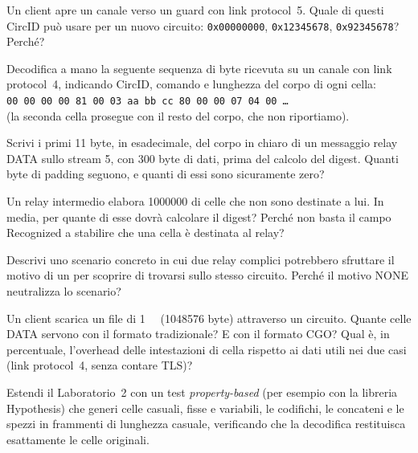\begin{esercizio}[1]\label{es:08-circid}
Un client apre un canale verso un guard con link protocol~5. Quale di questi CircID può usare per un nuovo circuito: \texttt{0x00000000}, \texttt{0x12345678}, \texttt{0x92345678}? Perché?
\end{esercizio}

\begin{esercizio}[2]\label{es:08-hex}
Decodifica a mano la seguente sequenza di byte ricevuta su un canale con link protocol~4, indicando CircID, comando e lunghezza del corpo di ogni cella:\\
\texttt{00 00 00 00 81 00 03 aa bb cc 80 00 00 07 04 00 \ldots}\\
(la seconda cella prosegue con il resto del corpo, che non riportiamo).
\end{esercizio}

\begin{esercizio}[2]\label{es:08-relay}
Scrivi i primi 11 byte, in esadecimale, del corpo in chiaro di un messaggio relay DATA sullo stream 5, con 300 byte di dati, prima del calcolo del digest. Quanti byte di padding seguono, e quanti di essi sono sicuramente zero?
\end{esercizio}

\begin{esercizio}[2]\label{es:08-recognized}
Un relay intermedio elabora \num{1000000} di celle che non sono destinate a lui. In media, per quante di esse dovrà calcolare il digest? Perché non basta il campo Recognized a stabilire che una cella è destinata al relay?
\end{esercizio}

\begin{esercizio}[2]\label{es:08-destroy}
Descrivi uno scenario concreto in cui due relay complici potrebbero sfruttare il motivo di un  per scoprire di trovarsi sullo stesso circuito. Perché il motivo NONE neutralizza lo scenario?
\end{esercizio}

\begin{esercizio}[2]\label{es:08-efficienza}
Un client scarica un file di \SI{1}{\mebi\byte} (\num{1048576} byte) attraverso un circuito. Quante celle DATA servono con il formato tradizionale? E con il formato CGO? Qual è, in percentuale, l'overhead delle intestazioni di cella rispetto ai dati utili nei due casi (link protocol~4, senza contare TLS)?
\end{esercizio}

\begin{esercizio}[3]\label{es:08-lab-fuzz}
Estendi il Laboratorio~2 con un test \emph{property-based} (per esempio con la libreria Hypothesis) che generi celle casuali, fisse e variabili, le codifichi, le concateni e le spezzi in frammenti di lunghezza casuale, verificando che la decodifica restituisca esattamente le celle originali.
\end{esercizio}

